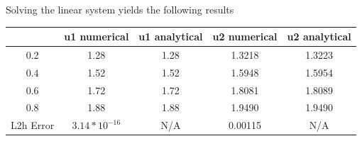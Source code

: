 \documentclass{article}
\begin{document}
Solving the linear system yields the following results
\begin{table}[H]
    \centering
    \begin{tabular}{c|c|c|c|c}
        & u1 numerical & u1 analytical & u2 numerical & u2 analytical \\ \hline
        0.2 & 1.28 & 1.28 & 1.3218 & 1.3223 \\ \hline
        0.4 & 1.52 & 1.52 & 1.5948 & 1.5954 \\ \hline
        0.6 & 1.72 & 1.72 & 1.8081 & 1.8089 \\ \hline
        0.8 & 1.88 & 1.88 & 1.9490 & 1.9490 \\ \hline
        L2h Error& $3.14 * 10^{-16}$ & N/A &0.00115 & N/A
        
    \end{tabular}
\end{table}
\end{document}
